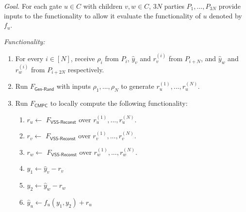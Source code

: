 \documentclass[11pt,letter]{article}
\newcommand{\func}[1]{\mbox{$F_\textsf{#1}$}}
\newcommand{\mask}[1]{\widehat{#1}}
\theoremstyle{mytheoremstyle}
\let\savedCaption=\caption
\renewcommand*{\caption}[1]{\savedCaption[#1]{~#1}}
\newcommand{\algfont}{}
\begin{document}
\begin{algorithm}
	\algfont
	\caption{\func{Circuit-Eval}}
	\label{fun:CircuitEval}
	
	\textit{Goal.} For each gate $u \in C$ with children $v,w \in C$, $3N$ parties $P_1,...,P_{3N}$ provide inputs to the functionality to allow it evaluate the functionality of $u$ denoted by $f_u$. \medskip
	
	\textit{Functionality:}
	\begin{enumerate}			
		\item For every $i \in [N]$, receive $\rho_i$ from $P_i$, $\mask{y}_v$ and $r^{(i)}_v$ from $P_{i+N}$, and $\mask{y}_w$ and $r^{(i)}_w$ from $P_{i+2N}$ respectively.
		\item Run \func{Gen-Rand} with inputs $\rho_1,...,\rho_N$ to generate $r^{(1)}_u,...,r^{(N)}_u$. 
		\item Run \func{CMPC} to locally compute the following functionality: \label{ln:cmpcfunc}
		\begin{enumerate}
			\item $r_u \gets$ \func{VSS-Reconst} over $r^{(1)}_u,...,r^{(N)}_u$.
			\item $r_v \gets$ \func{VSS-Reconst} over $r^{(1)}_v,...,r^{(N)}_v$.
			\item $r_w \gets$ \func{VSS-Reconst} over $r^{(1)}_w,...,r^{(N)}_w$. 
			\item $y_1 \gets \mask{y}_v - r_v$
			\item $y_2 \gets \mask{y}_w - r_w$
			\item $\mask{y}_u \gets f_u(y_1,y_2) + r_u$
		\end{enumerate}
		
	\end{enumerate}
\end{algorithm}
\end{document}
